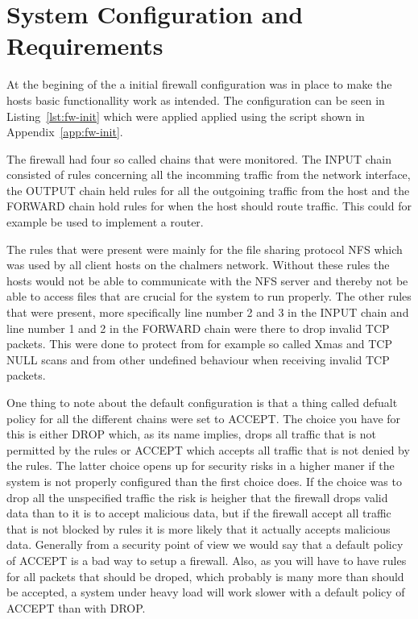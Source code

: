 \section{System Configuration and Requirements}
\label{sec:setup}

At the begining of the \lab a initial firewall configuration was in place to make the hosts basic functionallity work as intended. The configuration can be seen in Listing~\ref{lst:fw-init} which were applied applied using the script shown in Appendix~\ref{app:fw-init}. 

The firewall had four so called chains that were monitored. The INPUT chain consisted of rules concerning all the incomming traffic from the network interface, the OUTPUT chain held rules for all the outgoining traffic from the host and the FORWARD chain hold rules for when the host should route traffic. This could for example be used to implement a router.

The rules that were present were mainly for the file sharing protocol NFS which was used by all client hosts on the chalmers network. Without these rules the hosts would not be able to communicate with the NFS server and thereby not be able to access files that are crucial for the system to run properly. The other rules that were present, more specifically line number 2 and 3 in the INPUT chain and line number 1 and 2 in the FORWARD chain were there to drop invalid TCP packets. This were done to protect from for example so called Xmas and TCP NULL scans and from other undefined behaviour when receiving invalid TCP packets.

One thing to note about the default configuration is that a thing called defualt policy for all the different chains were set to ACCEPT. The choice you have for this is either DROP which, as its name implies, drops all traffic that is not permitted by the rules or ACCEPT which accepts all traffic that is not denied by the rules. The latter choice opens up for security risks in a higher maner if the system is not properly configured than the first choice does. If the choice was to drop all the unspecified traffic the risk is heigher that the firewall drops valid data than to it is to accept malicious data, but if the firewall accept all traffic that is not blocked by rules it is more likely that it actually accepts malicious data. Generally from a security point of view we would say that a default policy of ACCEPT is a bad way to setup a firewall. Also, as you will have to have rules for all packets that should be droped, which probably is many more than should be accepted, a system under heavy load will work slower with a default policy of ACCEPT than with DROP.




